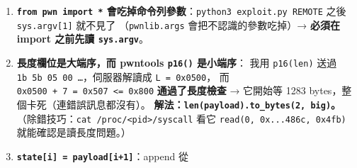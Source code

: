 \documentclass[10pt,a4paper]{article}
\providecommand{\tightlist}{%
  \setlength{\itemsep}{0pt}\setlength{\parskip}{0pt}}
\begin{document}
\begin{enumerate}
  \begin{itemize}
  \tightlist
  \item
    讓 stdout 也走 pipe（輸出不會被 PTY
    的終端機行為影響，\texttt{recvuntil}/\texttt{recvrepeat}
    更可預期）；
  \item
    讓本機與遠端（本來就是 socket）的行為一致，少一個變數。
    \textbf{真正會卡住的情況是}：你在 shell 裡手動 \texttt{./\allowbreak{}homemaker}
    然後想用管線餵二進位訊框， 或用了 \texttt{stdin=process.\allowbreak{}PTY} 又沒關
    canonical mode------那時才需要處理「要按 Enter」的問題。
    （除錯小技巧：\texttt{ls\ \allowbreak{}-\allowbreak{}l\ \allowbreak{}/\allowbreak{}proc/\allowbreak{}\textless{}\allowbreak{}pid\textgreater{}\allowbreak{}/\allowbreak{}fd/\allowbreak{}0}
    看 stdin 到底是 pipe 還是 \texttt{/\allowbreak{}dev/\allowbreak{}pts/\allowbreak{}N}。 本題實測
    \texttt{fd0\ \allowbreak{}-\allowbreak{}\textgreater{}\allowbreak{}\ \allowbreak{}pipe:{[}…{]}}、\texttt{fd1\ \allowbreak{}-\allowbreak{}\textgreater{}\allowbreak{}\ \allowbreak{}/\allowbreak{}dev/\allowbreak{}pts/\allowbreak{}0}。）
  \end{itemize}
\item
  \textbf{\texttt{from\ \allowbreak{}pwn\ \allowbreak{}import\ \allowbreak{}*}
  會吃掉命令列參數}：\texttt{python3\ \allowbreak{}exploit.\allowbreak{}py\ \allowbreak{}REMOTE} 之後
  \texttt{sys.\allowbreak{}argv{[}1{]}} 就不見了 （\texttt{pwnlib.\allowbreak{}args}
  會把不認識的參數吃掉）→ \textbf{必須在 import 之前先讀
  \texttt{sys.\allowbreak{}argv}}。
\item
  \textbf{長度欄位是大端序，而 pwntools \texttt{p16()} 是小端序}： 我用
  \texttt{p16(len)} 送過 \texttt{1b\ \allowbreak{}5b\ \allowbreak{}05\ \allowbreak{}00\ \allowbreak{}…}，伺服器解讀成
  \texttt{L\ \allowbreak{}=\ \allowbreak{}0x0500}， 而
  \texttt{0x0500\ \allowbreak{}+\ \allowbreak{}7\ \allowbreak{}=\ \allowbreak{}0x507\ \allowbreak{}\textless{}\allowbreak{}=\ \allowbreak{}0x800}
  \textbf{通過了長度檢查} → 它開始等 1283
  bytes，整個卡死（連錯誤訊息都沒有）。
  \textbf{解法：\texttt{len(payload).\allowbreak{}to\_\allowbreak{}bytes(2,\allowbreak{}\ \allowbreak{}\textquotesingle{}\allowbreak{}big\textquotesingle{}\allowbreak{})}。}
  （除錯技巧：\texttt{cat\ \allowbreak{}/\allowbreak{}proc/\allowbreak{}\textless{}\allowbreak{}pid\textgreater{}\allowbreak{}/\allowbreak{}syscall}
  看它 \texttt{read(0,\allowbreak{}\ \allowbreak{}0x...\allowbreak{}486c,\allowbreak{}\ \allowbreak{}0x4fb)} 就能確認是讀長度問題。）
\item
  \textbf{\texttt{state{[}i{]}\ \allowbreak{}=\ \allowbreak{}payload{[}i+1{]}}}：append 從

\end{enumerate}
\end{document}
